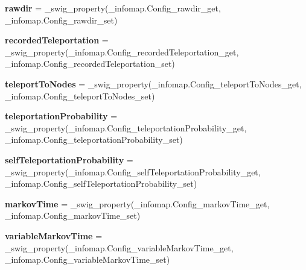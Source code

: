 \begin{DoxyCompactItemize}
{\bfseries rawdir} = \+\_\+swig\+\_\+property(\+\_\+infomap.\+Config\+\_\+rawdir\+\_\+get, \+\_\+infomap.\+Config\+\_\+rawdir\+\_\+set)
\item 
\mbox{\label{classdsmacc_1_1graph_1_1infomap_1_1infomap_1_1Config_a999689f75743a00e33c60f4956298eb7}} 
{\bfseries recorded\+Teleportation} = \+\_\+swig\+\_\+property(\+\_\+infomap.\+Config\+\_\+recorded\+Teleportation\+\_\+get, \+\_\+infomap.\+Config\+\_\+recorded\+Teleportation\+\_\+set)
\item 
\mbox{\label{classdsmacc_1_1graph_1_1infomap_1_1infomap_1_1Config_ab99bfd4a7bc3297bdb8b5d708c0e6649}} 
{\bfseries teleport\+To\+Nodes} = \+\_\+swig\+\_\+property(\+\_\+infomap.\+Config\+\_\+teleport\+To\+Nodes\+\_\+get, \+\_\+infomap.\+Config\+\_\+teleport\+To\+Nodes\+\_\+set)
\item 
\mbox{\label{classdsmacc_1_1graph_1_1infomap_1_1infomap_1_1Config_ada0d06a10a3bd9cf6d2f4e7f2d2cef2c}} 
{\bfseries teleportation\+Probability} = \+\_\+swig\+\_\+property(\+\_\+infomap.\+Config\+\_\+teleportation\+Probability\+\_\+get, \+\_\+infomap.\+Config\+\_\+teleportation\+Probability\+\_\+set)
\item 
\mbox{\label{classdsmacc_1_1graph_1_1infomap_1_1infomap_1_1Config_af48cab5ec584646a90204e21a9769a17}} 
{\bfseries self\+Teleportation\+Probability} = \+\_\+swig\+\_\+property(\+\_\+infomap.\+Config\+\_\+self\+Teleportation\+Probability\+\_\+get, \+\_\+infomap.\+Config\+\_\+self\+Teleportation\+Probability\+\_\+set)
\item 
\mbox{\label{classdsmacc_1_1graph_1_1infomap_1_1infomap_1_1Config_a49ac841bda0e9c77c08176256a1b72ce}} 
{\bfseries markov\+Time} = \+\_\+swig\+\_\+property(\+\_\+infomap.\+Config\+\_\+markov\+Time\+\_\+get, \+\_\+infomap.\+Config\+\_\+markov\+Time\+\_\+set)
\item 
\mbox{\label{classdsmacc_1_1graph_1_1infomap_1_1infomap_1_1Config_aba00ee9aaa0f32e19a01eaf39f4f43ad}} 
{\bfseries variable\+Markov\+Time} = \+\_\+swig\+\_\+property(\+\_\+infomap.\+Config\+\_\+variable\+Markov\+Time\+\_\+get, \+\_\+infomap.\+Config\+\_\+variable\+Markov\+Time\+\_\+set)

\end{DoxyCompactItemize}
